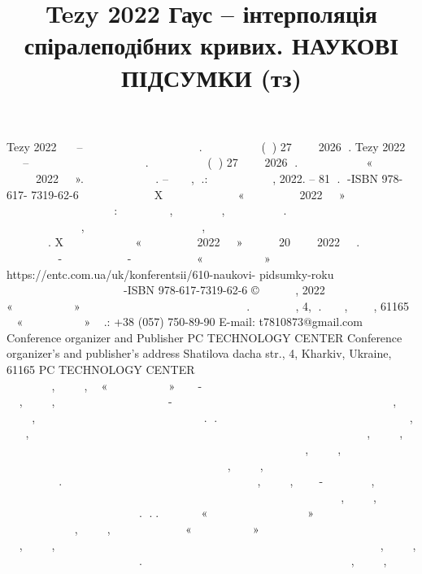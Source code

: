 \documentclass[12pt,a4paper]{article}
\begin{document}
\title{Tezy 2022 Гаус – інтерполяція спіралеподібних кривих. НАУКОВІ ПІДСУМКИ (тз)}
\maketitle
Tezy 2022 ￿￿￿￿ – ￿￿￿￿￿￿￿￿￿￿￿￿ ￿￿￿￿￿￿￿￿￿￿￿￿￿￿￿ ￿￿￿￿￿￿. ￿￿￿￿￿￿￿ ￿￿￿￿￿￿￿￿ (￿￿) 27 ￿￿￿￿￿￿ 2026 ￿. Tezy 2022 ￿￿￿￿ – ￿￿￿￿￿￿￿￿￿￿￿￿ ￿￿￿￿￿￿￿￿￿￿￿￿￿￿￿ ￿￿￿￿￿￿. ￿￿￿￿￿￿￿ ￿￿￿￿￿￿￿￿ (￿￿) 27 ￿￿￿￿￿￿ 2026 ￿. ￿￿￿￿￿￿￿ ￿￿￿￿￿￿￿￿￿￿￿ «￿￿￿￿￿￿￿ ￿￿￿￿￿￿￿￿ 2022 ￿￿￿￿». ￿￿￿￿￿￿ ￿￿￿￿￿￿￿￿ ￿￿￿￿￿. – ￿￿￿￿￿￿, ￿.: ￿￿￿￿￿￿￿￿￿￿￿￿￿ ￿￿￿￿￿, 2022. – 81 ￿. ￿-ISBN 978-617- 7319-62-6 ￿￿￿￿￿￿ ￿￿￿￿￿￿￿￿ ￿￿￿￿￿ X￿ ￿￿￿￿￿￿￿￿ ￿￿￿￿￿￿￿￿￿￿￿ «￿￿￿￿￿￿￿ ￿￿￿￿￿￿￿￿ 2022 ￿￿￿￿» ￿￿￿￿￿￿￿ ￿￿￿￿￿￿￿ ￿￿￿￿￿￿￿￿ ￿ ￿￿￿￿￿￿￿￿￿ ￿￿￿￿￿￿￿ ￿￿￿￿: ￿￿￿￿￿￿￿￿￿ ￿￿￿￿￿, ￿￿￿￿￿￿￿￿ ￿￿￿￿￿, ￿￿￿￿￿￿￿￿￿￿￿ ￿￿￿￿￿. ￿￿￿￿￿￿￿￿￿ ￿￿￿￿￿￿￿￿￿￿￿￿￿ ￿￿￿￿￿￿￿ ￿￿￿ ￿￿￿￿￿￿￿￿ ￿￿￿￿ ￿￿￿￿￿￿￿￿￿, ￿￿￿￿￿￿￿￿ ￿ ￿￿￿￿￿￿￿￿￿￿￿ ￿￿￿￿￿￿￿ ￿￿￿￿, ￿￿￿￿￿￿￿￿￿￿ ￿￿ ￿￿￿￿￿￿ ￿￿￿￿￿￿￿￿￿￿￿￿ ￿￿￿￿￿￿￿ ￿￿￿ ￿￿￿￿￿￿￿￿￿ ￿￿￿￿￿￿￿￿￿￿￿￿￿. X￿ ￿￿￿￿￿￿￿ ￿￿￿￿￿￿￿￿￿￿￿ «￿￿￿￿￿￿￿ ￿￿￿￿￿￿￿￿ 2022 ￿￿￿￿» ￿￿￿￿￿￿￿￿￿ 20 ￿￿￿￿￿￿ 2022 ￿￿￿￿. ￿￿￿￿￿￿￿￿￿ ￿￿￿￿￿￿￿￿￿￿￿ ￿￿￿￿- ￿￿￿￿￿￿￿ ￿￿ ￿￿￿￿￿￿￿￿-￿￿￿￿￿￿￿￿ ￿￿￿￿￿￿￿ ￿￿ «￿￿￿￿￿￿￿￿￿￿￿￿￿ ￿￿￿￿￿» https://entc.com.ua/uk/konferentsii/610-naukovi- pidsumky-roku ￿￿￿￿￿￿￿￿￿ ￿￿￿￿￿￿￿￿ ￿￿￿￿￿￿￿￿￿￿￿￿ ￿ ￿￿￿￿￿￿￿￿￿￿ ￿￿￿￿￿￿￿￿ ￿-ISBN 978-617-7319-62-6 © ￿￿￿ ￿￿￿￿￿￿, 2022 ￿￿￿￿￿￿￿￿￿￿￿ ￿￿ ￿￿￿￿￿￿￿￿ ￿￿ «￿￿￿￿￿￿￿￿￿￿￿￿￿ ￿￿￿￿￿» ￿￿￿￿￿￿ ￿￿￿￿￿￿￿￿￿￿￿￿ ￿￿￿￿￿￿￿￿￿￿￿ ￿￿ ￿￿￿￿￿￿￿￿￿￿￿ ￿￿￿. ￿￿￿￿￿￿￿￿ ￿￿￿￿, 4, ￿. ￿￿￿￿￿￿, ￿￿￿￿￿￿￿, 61165 ￿￿ «￿￿￿￿￿￿￿￿￿￿￿￿￿ ￿￿￿￿￿» ￿￿￿.: +38 (057) 750-89-90 E-mail: t7810873@gmail.com Conference organizer and Publisher PC TECHNOLOGY CENTER Conference organizer’s and publisher’s address Shatilova dacha str., 4, Kharkiv, Ukraine, 61165 PC TECHNOLOGY CENTER ￿￿￿￿￿￿ ￿￿￿￿￿￿￿￿￿￿￿￿￿￿￿ ￿￿￿￿￿￿￿￿ ￿￿￿￿￿￿ ￿￿￿￿￿￿ ￿￿￿￿￿￿￿￿￿￿￿￿￿ ￿￿￿￿￿￿ ￿￿￿￿￿￿￿￿￿ ￿￿￿￿, ￿￿￿￿￿￿￿￿, ￿￿ «￿￿￿￿￿￿￿￿￿￿￿￿￿ ￿￿￿￿￿» ￿￿￿￿￿￿- ￿￿￿￿￿￿￿￿ ￿￿￿￿￿￿￿ ￿￿￿￿￿￿￿￿￿￿ ￿￿￿￿￿ ￿￿￿￿￿￿￿￿￿ ￿￿￿￿￿￿ ￿￿￿￿￿￿￿￿￿￿￿ ￿￿￿￿, ￿￿￿￿￿￿￿￿, ￿￿￿￿￿￿￿￿￿ ￿￿￿￿￿￿￿￿￿￿￿￿ ￿￿￿￿￿￿￿￿￿￿￿-￿￿￿￿￿￿￿￿￿￿￿ ￿￿￿￿￿￿￿￿￿￿￿ ￿￿￿￿￿￿ ￿￿￿￿￿￿ ￿￿￿￿￿￿￿￿ ￿￿￿￿￿￿ ￿￿￿￿￿￿￿￿￿ ￿￿￿￿, ￿￿￿￿￿￿￿￿, ￿￿￿￿￿￿￿￿￿￿￿ ￿￿￿￿￿￿￿￿￿￿￿￿ ￿￿￿￿￿￿￿￿￿￿￿ ￿￿￿￿￿￿￿￿￿￿￿ ￿￿. ￿. ￿￿￿￿￿￿￿ ￿￿￿￿￿￿￿ ￿￿￿￿￿￿ ￿￿￿￿￿￿￿￿￿￿￿￿￿ ￿￿￿￿￿￿ ￿￿￿￿￿￿￿￿￿ ￿￿￿￿, ￿￿￿￿￿￿, ￿￿￿￿￿￿￿￿￿￿￿ ￿￿￿￿￿￿￿￿￿ ￿￿￿￿￿￿￿￿￿￿￿ ￿￿￿￿￿￿￿￿￿￿￿￿ ￿￿￿￿￿￿￿￿￿￿ ￿￿￿￿￿￿ ￿￿￿￿ ￿￿￿￿￿￿￿￿￿￿￿ ￿￿￿￿￿￿ ￿￿￿￿￿￿￿￿￿ ￿￿￿￿, ￿￿￿￿￿￿￿￿, ￿￿￿￿￿￿￿￿￿ ￿￿￿￿￿￿￿￿ ￿￿￿￿￿￿￿￿￿￿￿￿￿ ￿￿￿￿￿￿￿￿ ￿￿￿￿￿￿￿￿ ￿￿￿￿￿￿￿￿ ￿￿￿￿￿￿￿￿ ￿￿￿￿￿￿ ￿￿￿￿￿￿￿￿￿￿￿ ￿￿￿￿, ￿￿￿￿￿￿￿￿, ￿￿￿￿￿￿￿￿ ￿￿￿￿￿￿￿￿￿￿￿￿ ￿￿￿￿￿￿￿￿ ￿￿￿￿￿￿￿￿￿￿￿ ￿￿￿￿￿ ￿￿￿￿￿ ￿￿￿￿￿￿￿￿￿￿ ￿￿￿￿￿￿ ￿￿￿￿￿￿￿￿￿￿￿￿ ￿￿￿￿, ￿￿￿￿￿￿￿￿, ￿￿￿￿￿￿￿￿￿￿ ￿￿￿￿￿￿￿￿￿ ￿￿￿￿￿￿￿￿￿￿￿ ￿￿￿￿￿￿￿￿ ￿￿￿￿￿￿￿￿ ￿￿￿￿￿ ￿. ￿￿￿￿￿￿￿￿￿￿￿ ￿￿￿￿￿ ￿￿￿￿￿￿￿ ￿￿￿￿￿￿￿￿￿￿￿ ￿￿￿￿￿￿ ￿￿￿￿￿￿￿￿￿ ￿￿￿￿, ￿￿￿￿￿￿￿￿, ￿￿￿￿￿￿￿-￿￿￿￿￿￿￿￿￿ ￿￿￿￿￿, ￿￿￿￿￿￿￿￿￿￿￿￿ ￿￿￿￿￿￿￿￿￿￿￿ ￿￿￿￿￿￿￿￿￿￿ ￿￿￿￿￿￿￿ ￿￿￿￿￿￿￿ ￿￿￿￿￿￿￿￿￿￿ ￿￿￿￿ ￿￿￿￿￿￿￿￿￿￿￿￿￿ ￿￿￿￿￿￿ ￿￿￿￿￿￿￿￿￿ ￿￿￿￿, ￿￿￿￿￿￿￿￿, ￿￿￿￿￿￿￿￿￿￿￿￿ ￿￿￿￿￿￿￿￿￿￿￿￿￿ ￿￿￿￿￿￿￿￿￿￿￿ ￿￿. ￿.￿. ￿￿￿￿￿￿￿￿￿￿￿ «￿￿￿￿￿￿￿￿￿￿￿ ￿￿￿￿￿￿￿￿￿￿ ￿￿￿￿￿￿￿￿» ￿￿￿￿￿￿￿￿￿￿ ￿￿￿￿￿￿ ￿￿￿￿￿￿￿￿ ￿￿￿￿￿￿ ￿￿￿￿￿￿￿￿￿ ￿￿￿￿, ￿￿￿￿￿￿￿￿, ￿￿￿￿￿￿￿￿￿ ￿￿￿￿￿￿￿￿￿￿￿ «￿￿￿￿￿￿￿ ￿￿￿￿￿￿￿￿￿￿￿» ￿￿￿￿￿￿ ￿￿￿￿￿￿￿￿￿ ￿￿￿￿￿￿￿￿￿￿ ￿￿￿￿￿￿ ￿￿￿￿￿￿￿￿￿ ￿￿￿￿, ￿￿￿￿￿￿￿￿, ￿￿￿￿￿￿￿ ￿￿￿￿￿￿￿￿￿￿￿ ￿￿￿￿￿￿￿￿ ￿￿￿￿￿￿￿￿ ￿￿￿￿￿￿￿￿￿￿ ￿￿￿￿￿￿ ￿￿￿￿￿￿￿￿￿ ￿￿￿￿￿￿￿￿￿￿￿ ￿￿￿￿￿￿ ￿￿￿￿￿￿￿￿￿ ￿￿￿￿, ￿￿￿￿￿￿￿￿, ￿￿￿￿￿￿￿￿￿￿￿￿￿ ￿￿￿￿￿￿￿￿￿￿￿￿ ￿￿￿￿￿￿￿￿￿￿￿ ￿￿. ￿￿￿￿￿ ￿￿￿￿￿￿ ￿￿￿￿￿ ￿￿￿￿￿￿￿￿ ￿￿￿￿￿￿￿￿￿￿￿￿￿ ￿￿￿￿￿￿ ￿￿￿￿￿￿￿￿￿ ￿￿￿￿, ￿￿￿￿￿￿￿￿, ￿￿￿￿￿￿￿￿￿￿￿ ￿￿￿￿￿￿￿￿￿￿￿￿ ￿￿￿￿￿￿￿￿￿￿￿ ￿￿￿￿￿￿￿￿￿￿ ￿￿￿ ￿￿￿￿￿ ￿￿￿￿￿ ￿￿￿￿￿￿￿￿ ￿￿￿￿￿ ￿￿￿￿ 
\end{document}
